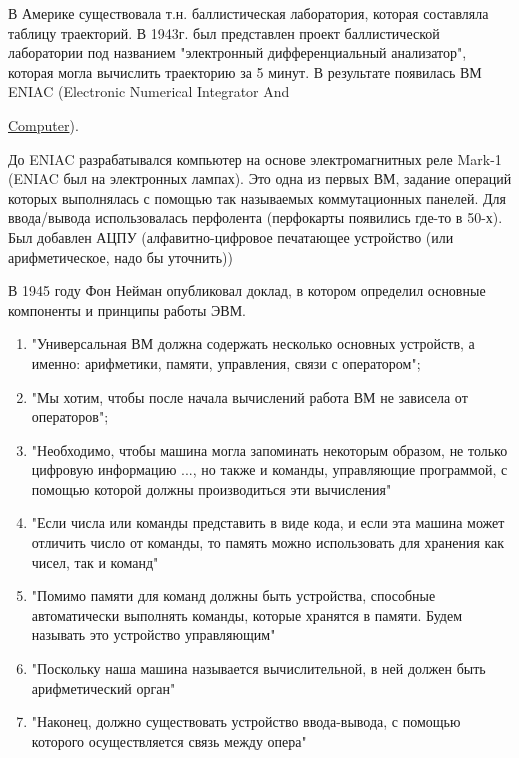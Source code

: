 \documentclass[14pt, a4paper]{article}
\begin{document}
	В Америке существовала т.н. баллистическая лаборатория, которая составляла таблицу траекторий.
	В 1943г. был представлен проект баллистической лаборатории под названием
	"электронный дифференциальный анализатор", которая могла вычислить траекторию за 5 минут.
	В результате появилась ВМ ENIAC (Electronic Numerical Integrator And {\underline {Computer}).
	
	До ENIAC разрабатывался компьютер на основе электромагнитных реле Mark-1 (ENIAC был на электронных лампах).
	Это одна из первых ВМ, задание операций которых выполнялась с помощью так называемых коммутационных панелей.
	Для ввода/вывода использовалась перфолента (перфокарты появились где-то в 50-х). Был добавлен АЦПУ (алфавитно-цифровое печатающее устройство (или арифметическое, надо бы уточнить))
	
	В 1945 году Фон Нейман опубликовал доклад, в котором определил основные компоненты и принципы работы ЭВМ.
	
	\begin{enumerate}
		
		\item "Универсальная ВМ должна содержать несколько основных
		устройств, а именно: арифметики,
		памяти, управления, связи с оператором";
		
		\item "Мы хотим, чтобы после начала вычислений работа ВМ не зависела от операторов";
		
		\item "Необходимо, чтобы машина могла запоминать некоторым образом, 
		не только цифровую информацию ..., но также и команды, управляющие программой, 
		с помощью которой должны производиться эти вычисления"
		
		\item "Если числа или команды представить в виде кода, и если
		эта машина может отличить число от команды, то память можно
		использовать для хранения как чисел, так и команд"
		
		\item "Помимо памяти для команд должны быть устройства, способные
		автоматически выполнять команды, которые хранятся в памяти.
		Будем называть это устройство управляющим"
		
		\item "Поскольку наша машина называется вычислительной, в ней должен быть арифметический орган"
		
		\item "Наконец, должно существовать устройство ввода-вывода,
		с помощью которого осуществляется связь между опера"
		

\end{enumerate}}
\end{document}
